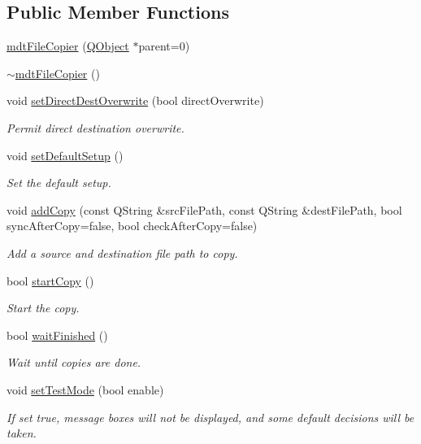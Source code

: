 \subsection*{Public Member Functions}
\begin{DoxyCompactItemize}
\item 
\hyperlink{classmdt_file_copier_a32fc7a1c4d796ce0f3781c24257a0a02}{mdt\-File\-Copier} (\hyperlink{class_q_object}{Q\-Object} $\ast$parent=0)
\item 
\hyperlink{classmdt_file_copier_a818453c5591e4ec9c6de6adc67bc4e00}{$\sim$mdt\-File\-Copier} ()
\item 
void \hyperlink{classmdt_file_copier_ad045db0c7b84a7c9505d7ac1704f7413}{set\-Direct\-Dest\-Overwrite} (bool direct\-Overwrite)
\begin{DoxyCompactList}\small\item\em Permit direct destination overwrite. \end{DoxyCompactList}\item 
void \hyperlink{classmdt_file_copier_a868ce61ec7d8f590002dd350276413a4}{set\-Default\-Setup} ()
\begin{DoxyCompactList}\small\item\em Set the default setup. \end{DoxyCompactList}\item 
void \hyperlink{classmdt_file_copier_ad0730aae81b3ba64eec4563390b852a3}{add\-Copy} (const Q\-String \&src\-File\-Path, const Q\-String \&dest\-File\-Path, bool sync\-After\-Copy=false, bool check\-After\-Copy=false)
\begin{DoxyCompactList}\small\item\em Add a source and destination file path to copy. \end{DoxyCompactList}\item 
bool \hyperlink{classmdt_file_copier_acd5397fbea57f8169a5dddd2809d26cb}{start\-Copy} ()
\begin{DoxyCompactList}\small\item\em Start the copy. \end{DoxyCompactList}\item 
bool \hyperlink{classmdt_file_copier_adcfa582fe6e1e3420c8285c2301323f6}{wait\-Finished} ()
\begin{DoxyCompactList}\small\item\em Wait until copies are done. \end{DoxyCompactList}\item 
void \hyperlink{classmdt_file_copier_ad971d6b727c4ceaa1a39bf356d694654}{set\-Test\-Mode} (bool enable)
\begin{DoxyCompactList}\small\item\em If set true, message boxes will not be displayed, and some default decisions will be taken. \end{DoxyCompactList}\end{DoxyCompactItemize}


